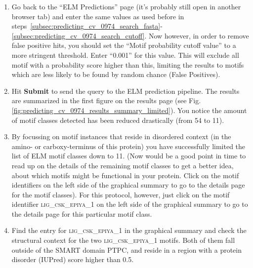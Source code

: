 \documentclass[12pt]{article}
\newcounter{proto}
\newcommand\button[1]{%
	\textbf{#1}%
}
\newcommand\motif[1]{%
    \textsc{\lowercase{#1}}%
}
\begin{document}
\begin{enumerate}
	\item Go back to the ``ELM Predictions'' page (it's probably still open in
	    another browser tab) and enter the same values as used before in
		steps~\ref{subsec:predicting_cv_0974_search_fasta}-\ref{subsec:predicting_cv_0974_search_cutoff}.
		Now however, in order to remove false positive hits,
	    you should set the ``Motif probability cutoff value'' to a more
		stringent threshold. Enter ``0.001'' for this value. This will exclude
		all motif with a probability score higher than this, limiting the
		results to motifs which are less likely to be found by random
		chance (False Positives).

	\item Hit \button{Submit} to send the query to the ELM prediction pipeline.
	    The results are summarized in the first figure on the results page
		(see Fig. \ref{fig:predicting_cv_0974_results_summary_limited}).
	    You notice the amount of motif classes detected has been
	    reduced drastically (from 54 to 11). %

	\item By focussing on motif instances that reside in disordered context (in the
	    amino- or carboxy-terminus of this protein)
	    you have successfully limited the list of ELM motif classes down to 11.
	    (Now would be a good point in time to read up on the details of the
	    remaining motif classes to get a better idea, about which motifs might be
	    functional in your protein. Click on the motif identifiers on the left side
	    of the graphical summary to go to the details page for the motif classes).
	    For this protocol, however, just click on the motif identifier
	    \motif{LIG\_CSK\_EPIYA\_1} on the left side of the graphical summary to go
	    to the details page for this particular motif class.

	\item Find the entry for \motif{LIG\_CSK\_EPIYA\_1} in the graphical summary
	    and check the structural context for the two \motif{LIG\_CSK\_EPIYA\_1} motifs.
	    Both of them fall outside of the SMART
	    domain PTPC, and reside in a region with a protein disorder (IUPred) score
	    higher than 0.5. 


\end{enumerate}
\end{document}
